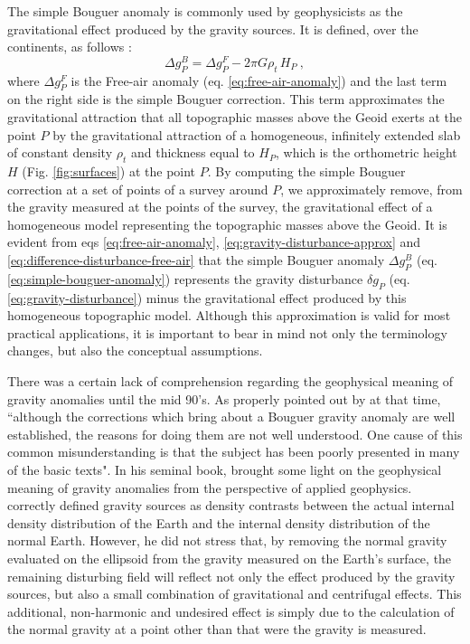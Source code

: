 \documentclass[extra]{gji}
\begin{document}
The simple Bouguer anomaly is commonly used by geophysicists as the
gravitational effect produced by the gravity sources.
It is defined, over the continents, as follows 
\citep{blakely1996, hofmann-wellenhof-moritz2005}:
\begin{equation}
\Delta g_{P}^{B} 
= \Delta g_{P}^{F} - 2 \pi G \rho_{t} \, H_{P} \: ,
\label{eq:simple-bouguer-anomaly}
\end{equation}
where $\Delta g_{P}^{F}$ is the Free-air anomaly (eq. \ref{eq:free-air-anomaly})
and the last term on the right side is the simple Bouguer correction.
This term approximates the gravitational attraction that all topographic 
masses above the Geoid exerts at the point $P$ by the gravitational 
attraction of a homogeneous, infinitely extended slab of 
constant density $\rho_{t}$ and thickness equal to $H_{P}$, which is 
the orthometric height $H$ (Fig. \ref{fig:surfaces}) at the point $P$.
By computing the simple Bouguer correction at a set of points
of a survey around $P$, we approximately remove, 
from the gravity measured at the points of the survey,
the gravitational effect of a homogeneous model representing 
the topographic masses above the Geoid.
It is evident from eqs \ref{eq:free-air-anomaly}, \ref{eq:gravity-disturbance-approx}
and \ref{eq:difference-disturbance-free-air} that the simple Bouguer
anomaly $\Delta g_{P}^{B}$ (eq. \ref{eq:simple-bouguer-anomaly}) represents
the gravity disturbance $\delta g_{P}$ (eq. \ref{eq:gravity-disturbance})
minus the gravitational effect produced by this homogeneous topographic model.
Although this approximation is valid for most practical applications,
it is important to bear in mind not only the terminology 
changes, but also the conceptual assumptions.

There was a certain lack of comprehension regarding the
geophysical meaning of gravity anomalies until the
mid 90's.
As properly pointed out by \citet{chapin1996} at that time, 
``although the corrections which bring about a Bouguer 
gravity anomaly are well established, the reasons for doing
them are not well understood. One cause of this common 
misunderstanding is that the subject has been poorly presented in
many of the basic texts".
In his seminal book, \citet{blakely1996} brought some light
on the geophysical meaning of gravity anomalies from the 
perspective of applied geophysics. \citet{blakely1996} correctly
defined gravity sources as density contrasts between the actual
internal density distribution of the Earth and the internal density
distribution of the normal Earth.
However, he did not stress that, by removing the normal gravity 
evaluated on the ellipsoid from the gravity measured 
on the Earth's surface, the remaining disturbing field will reflect 
not only the effect produced by the gravity sources, but also a
small combination of gravitational and centrifugal effects.
This additional, non-harmonic and undesired effect is 
simply due to the calculation of the normal gravity at a point
other than that were the gravity is measured.
\end{document}
